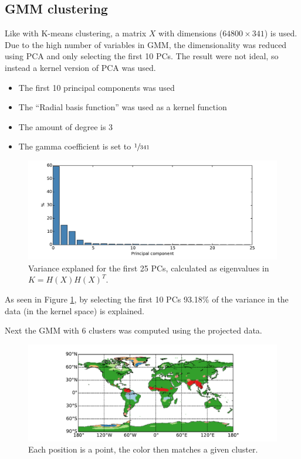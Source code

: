 \subsection{GMM clustering}
\label{section:result-gmm}

Like with K-means clustering, a matrix $X$ with dimensions ($64800 \times 341$) is used. Due to the high number of variables in GMM, the dimensionality was reduced using PCA and only selecting the first 10 PCs.
The result were not ideal, so instead a kernel version of PCA was used.

\begin{itemize}
\item The first 10 principal components was used
\item The ``Radial basis function'' was used as a kernel function
\item The amount of degree is 3
\item The gamma coefficient is set to $\sfrac{1}{341}$
\end{itemize}

\begin{figure}[H]
	\center
	\includegraphics[width=\textwidth]{figures/gmm-pca-explaned}
	\caption{Variance explaned for the first 25 PCs, calculated as eigenvalues in $K = H(X) H(X)^T$.}
	\label{fig:gmm-pca-explaned}
\end{figure}

As seen in Figure \ref{fig:gmm-pca-explaned}, by selecting the first 10 PCs 93.18\% of the variance in the data (in the kernel space) is explained.

Next the GMM with 6 clusters was computed using the projected data. 
\begin{figure}[H]
	\center
	\includegraphics[width=\textwidth]{figures/gmm-world}
	\caption{Each position is a point, the color then matches a given cluster.}
\end{figure}

